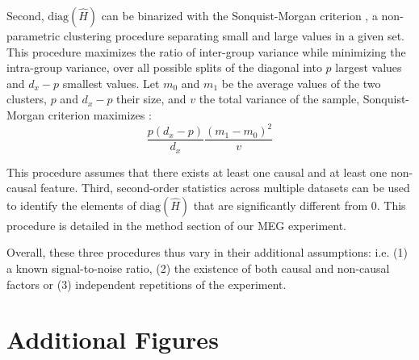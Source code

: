 Second, $\text{diag}(\hat H)$ can be binarized with the Sonquist-Morgan
criterion \citep{sonquist_morgan}, a non-parametric clustering procedure
separating small and large values in a given set. This procedure maximizes the
ratio of inter-group variance while minimizing the intra-group variance, over
all possible splits of the diagonal into $p$ largest values and $d_x-p$ smallest
values. Let $m_0$ and $m_1$ be the average values of the two clusters, $p$ and
$d_x-p$ their size, and $v$ the total variance of the sample, Sonquist-Morgan
criterion maximizes \citep{kass75}:
\begin{equation}
  \frac{p(d_x-p)}{d_x} \frac{(m_1 - m_0)^2}{v}
\end{equation}

This procedure assumes that there exists at least one causal and at least one
non-causal feature.
%
Third, second-order statistics across multiple datasets can be used to identify
the elements of $\text{diag}(\hat H)$ that are significantly different from 0.
This procedure is detailed in the method section of our MEG experiment.

Overall, these three procedures thus vary in their additional assumptions: i.e.
(1) a known signal-to-noise ratio, (2) the existence of both causal and
non-causal factors or (3) independent repetitions of the experiment.

\section{Additional Figures}




